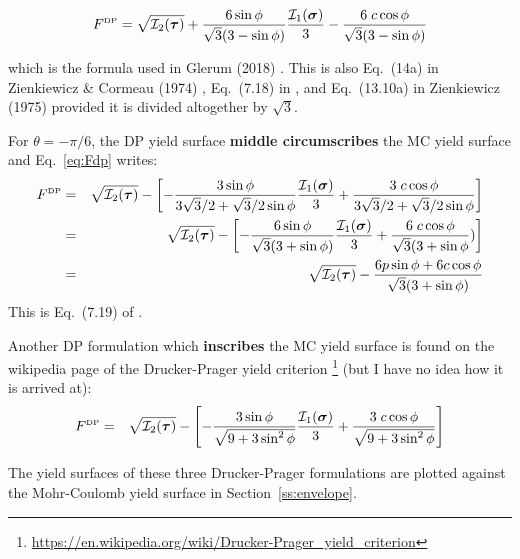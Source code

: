 \begin{mdframed}[backgroundcolor=blue!5]
\begin{equation}
F^{\text{\tiny DP}}
= \sqrt{{\cal I}_2({\bm \tau})} 
+ \frac{ 6 \sin \phi }{ \sqrt{3}(3 - \sin\phi)} \frac{{\cal I}_1({\bm\sigma})}{3}
- \frac{ 6\; c \cos \phi }{ \sqrt{3}(3 - \sin\phi)} 
\end{equation}
\end{mdframed}

which is the formula used in Glerum \etal (2018) \cite{gltf18}.
This is also Eq.~(14a) in Zienkiewicz \& Cormeau (1974) \cite{zico74}, 
Eq.~(7.18) in \textcite{owhi}, and Eq.~(13.10a) in Zienkiewicz (1975) \cite{zien75} 
provided it is divided altogether by $\sqrt 3$. 


For $\theta=-\pi/6$, the DP yield surface {\bf middle circumscribes} the MC yield surface 
and Eq.~\eqref{eq:Fdp} writes:
\begin{eqnarray}
F^{\text{\tiny DP}}
&=& \sqrt{{\cal I}_2({\bm \tau})} 
- \left[ -\frac{3 \sin\phi}{ 3 \sqrt{3}/2 + \sqrt{3}/2 \sin\phi}  \frac{{\cal I}_1({\bm \sigma})}{3}
+ \frac{ 3\; c \cos \phi }{ 3 \sqrt{3}/2 + \sqrt{3}/2 \sin\phi} \right] \nonumber\\
&=& \sqrt{{\cal I}_2({\bm \tau})} 
- \left[ -\frac{6 \sin\phi}{\sqrt{3} (3 + \sin\phi) }  \frac{{\cal I}_1({\bm \sigma})}{3}
+ \frac{ 6\; c \cos \phi }{ \sqrt{3}(3 + \sin\phi}) \right] \nonumber\\
&=& \sqrt{{\cal I}_2({\bm \tau})} 
- \frac{6 p \sin\phi + 6 c \cos \phi}{\sqrt{3} (3 + \sin\phi) } 
\end{eqnarray}
This is Eq.~(7.19) of \textcite{owhi}.

Another DP formulation which {\bf inscribes} the MC yield surface is found on the 
wikipedia page of the Drucker-Prager yield criterion
\footnote{\url{https://en.wikipedia.org/wiki/Drucker-Prager_yield_criterion}}
(but I have no idea how it is arrived at):
\begin{eqnarray}
F^{\text{\tiny DP}}
&=& \sqrt{{\cal I}_2({\bm \tau})} 
- \left[ -\frac{3 \sin\phi}{\sqrt{9+3\sin^2\phi} }  \frac{{\cal I}_1({\bm \sigma})}{3}
+ \frac{ 3\; c \cos \phi }{ \sqrt{9+3\sin^2\phi} } \right] \label{eq:dp3}
\end{eqnarray}

The yield surfaces of these three Drucker-Prager formulations are plotted against the Mohr-Coulomb
yield surface in Section~\ref{ss:envelope}. 




